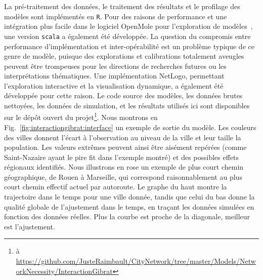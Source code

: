 {La pré-traitement des données, le traitement des résultats et le profilage des modèles sont implémentés en \texttt{R}. Pour des raisons de performance et une intégration plus facile dans le logiciel OpenMole pour l'exploration de modèles~\cite{reuillon2013openmole}, une version \texttt{scala} a également été développée. La question du compromis entre performance d'implémentation et inter-opérabilité est un problème typique de ce genre de modèle, puisque des explorations et calibrations totalement aveugles peuvent être trompeuses pour les directions de recherches futures ou les interprétations thématiques. Une implémentation NetLogo, permettant l'exploration interactive et la visualisation dynamique, a également été développée pour cette raison. Le code source des modèles, les données brutes nettoyées, les données de simulation, et les résultats utilisés ici sont disponibles sur le dépôt ouvert du projet\footnote{à \url{https://github.com/JusteRaimbault/CityNetwork/tree/master/Models/NetworkNecessity/InteractionGibrat}}. Nous montrons en Fig.~\ref{fig:interactiongibrat:interface} un exemple de sortie du modèle. Les couleurs des villes donnent l'écart à l'observation au niveau de la ville et leur taille la population. Les valeurs extrêmes peuvent ainsi être aisément repérées (comme Saint-Nazaire ayant le pire fit dans l'exemple montré) et des possibles effets régionaux identifiés. Nous illustrons en rose un exemple de plus court chemin géographique, de Rouen à Marseille, qui correspond raisonnablement au plus court chemin effectif actuel par autoroute. Le graphe du haut montre la trajectoire dans le temps pour une ville donnée, tandis que celui du bas donne la qualité globale de l'ajustement dans le temps, en traçant les données simulées en fonction des données réelles. Plus la courbe est proche de la diagonale, meilleur est l'ajustement.
}

